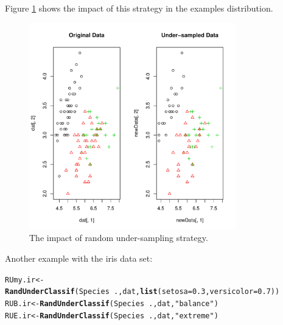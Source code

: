 \documentclass[10pt,a4paper]{article}\usepackage[]{graphicx}\usepackage[]{color}
\makeatletter
\newcommand{\hlnum}[1]{\textcolor[rgb]{0.686,0.059,0.569}{#1}}%
\newcommand{\hlstr}[1]{\textcolor[rgb]{0.192,0.494,0.8}{#1}}%
\newcommand{\hlopt}[1]{\textcolor[rgb]{0,0,0}{#1}}%
\newcommand{\hlstd}[1]{\textcolor[rgb]{0.345,0.345,0.345}{#1}}%
\newcommand{\hlkwb}[1]{\textcolor[rgb]{0.69,0.353,0.396}{#1}}%
\newcommand{\hlkwc}[1]{\textcolor[rgb]{0.333,0.667,0.333}{#1}}%
\newcommand{\hlkwd}[1]{\textcolor[rgb]{0.737,0.353,0.396}{\textbf{#1}}}%
\newenvironment{kframe}{%
 \def\at@end@of@kframe{}%
 \ifinner\ifhmode%
  \def\at@end@of@kframe{\end{minipage}}%
  \begin{minipage}{\columnwidth}%
 \fi\fi%
 \def\FrameCommand##1{\hskip\@totalleftmargin \hskip-\fboxsep
 \colorbox{shadecolor}{##1}\hskip-\fboxsep
     \hskip-\linewidth \hskip-\@totalleftmargin \hskip\columnwidth}%
 \MakeFramed {\advance\hsize-\width
   \@totalleftmargin\z@ \linewidth\hsize
   \@setminipage}}%
 {\par\unskip\endMakeFramed%
 \at@end@of@kframe}
\newenvironment{knitrout}{}{} %
\makeatother
\begin{document}
Figure \ref{fig:Iris_RU1} shows the impact of this strategy in the examples distribution.


\begin{knitrout}\footnotesize
{}\color{fgcolor}\begin{figure}

{\centering \includegraphics[width=0.8\textwidth]{figures/UBL-Iris_RU1-1} 

}

\caption[The impact of random under-sampling strategy]{The impact of random under-sampling strategy.}\label{fig:Iris_RU1}
\end{figure}


\end{knitrout}

Another example with the iris data set:

\begin{knitrout}\footnotesize
{}\color{fgcolor}\begin{kframe}
\begin{alltt}
  \hlstd{RUmy.ir} \hlkwb{<-} \hlkwd{RandUnderClassif}\hlstd{(Species}\hlopt{~}\hlstd{., dat,} \hlkwd{list}\hlstd{(}\hlkwc{setosa}\hlstd{=}\hlnum{0.3}\hlstd{,} \hlkwc{versicolor}\hlstd{=}\hlnum{0.7}\hlstd{))}
  \hlstd{RUB.ir} \hlkwb{<-} \hlkwd{RandUnderClassif}\hlstd{(Species}\hlopt{~}\hlstd{., dat,} \hlstr{"balance"}\hlstd{)}
  \hlstd{RUE.ir} \hlkwb{<-} \hlkwd{RandUnderClassif}\hlstd{(Species}\hlopt{~}\hlstd{., dat,} \hlstr{"extreme"}\hlstd{)}
\end{alltt}
\end{kframe}
\end{knitrout}
\end{document}
